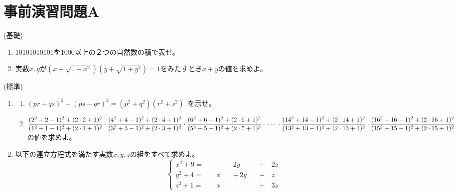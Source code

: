 \documentclass[a4paper,12pt]{jsarticle}
\newcommand{\ds}{\displaystyle}
\begin{document}
\section*{事前演習問題A} %

 (基礎)

\begin{enumerate}
\item 
10101010101を1000以上の２つの自然数の積で表せ。

\item 
実数$x,y$が$(x+\sqrt{1+x^2})(y+\sqrt{1+y^2})=1$をみたすとき$x+y$の値を求めよ。 

\end{enumerate}

\bigskip

 (標準)

\begin{enumerate}
\item 
  \begin{enumerate}
  \item $(pr+qs)^{2} + (ps-qr)^{2} = (p^{2}+q^{2})(r^{2}+s^{2})$\ を示せ。
  \item \vspace{0.5zw}
  {\small $\ds \frac{(2^{2} + 2 - 1 )^{2} + ( 2 \cdot 2 + 1 )^{2}}{(1^{2} + 1 - 1 )^{2} + ( 2 \cdot 1 + 1 )^{2}} \cdot \frac{(4^{2} + 4 - 1 )^{2} + ( 2 \cdot 4 + 1 )^{2}}{(3^{2} + 3 - 1 )^{2} + ( 2 \cdot 3 + 1 )^{2}} \cdot \frac{(6^{2} + 6 - 1 )^{2} + ( 2 \cdot 6 + 1 )^{2}}{(5^{2} + 5 - 1 )^{2} + ( 2 \cdot 5 + 1 )^{2}} \cdot \  \\ \hfill \cdots \ \cdot \frac{(14^{2} + 14 - 1 )^{2} + ( 2 \cdot 14 + 1 )^{2}}{(13^{2} + 13 - 1 )^{2} + ( 2 \cdot 13 + 1 )^{2}}\cdot \frac{(16^{2} + 16 - 1 )^{2} + ( 2 \cdot 16 + 1 )^{2}}{(15^{2} + 15 - 1 )^{2} + ( 2 \cdot 15 + 1 )^{2}}$}\\
の値を求めよ。
  \end{enumerate}
  
\item 
以下の連立方程式を満たす実数$x,y,z$の組をすべて求めよ。
\begin{equation}
  \left\{
    \begin{alignedat}{4}
      x^{2} + 9  =&\ &  & \  &   2y & \ &+ &\,2z   \\ 
      y^{2} + 4  =&  &x &    &+\,2y &   &+ &\,z   \\
      z^{2} + 1  =&  &x &    &      &   &+ &\,3z  \nonumber
    \end{alignedat}
  \right.
\end{equation}

\end{enumerate}
\end{document}

